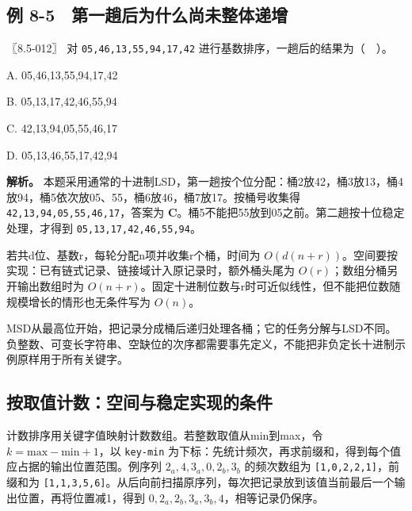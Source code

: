 
\subsection{例 8-5　第一趟后为什么尚未整体递增}\label{ds-ex8-5}

\noindent{}〖8.5-012〗 对 \texttt{05,}\allowbreak{}\texttt{46,}\allowbreak{}\texttt{13,}\allowbreak{}\texttt{55,}\allowbreak{}\texttt{94,}\allowbreak{}\texttt{17,}\allowbreak{}\texttt{42} 进行基数排序，一趟后的结果为（　）。

A. 05,46,13,55,94,17,42

B. 05,13,17,42,46,55,94

C. 42,13,94,05,55,46,17

D. 05,13,46,55,17,42,94


\textbf{解析。} 本题采用通常的十进制LSD，第一趟按个位分配：桶2放42，桶3放13，桶4放94，桶5依次放05、55，桶6放46，桶7放17。按桶号收集得 \texttt{42,}\allowbreak{}\texttt{13,}\allowbreak{}\texttt{94,}\allowbreak{}\texttt{05,}\allowbreak{}\texttt{55,}\allowbreak{}\texttt{46,}\allowbreak{}\texttt{17}，答案为 \textbf{C}。桶5不能把55放到05之前。第二趟按十位稳定处理，才得到 \texttt{05,}\allowbreak{}\texttt{13,}\allowbreak{}\texttt{17,}\allowbreak{}\texttt{42,}\allowbreak{}\texttt{46,}\allowbreak{}\texttt{55,}\allowbreak{}\texttt{94}。

若共d位、基数r，每轮分配n项并收集r个桶，时间为 \(O(d(n+r))\)。空间要按实现：已有链式记录、链接域计入原记录时，额外桶头尾为 \(O(r)\)；数组分桶另开输出数组时为 \(O(n+r)\)。固定十进制位数与r时可近似线性，但不能把位数随规模增长的情形也无条件写为 \(O(n)\)。

MSD从最高位开始，把记录分成桶后递归处理各桶；它的任务分解与LSD不同。负整数、可变长字符串、空缺位的次序都需要事先定义，不能把非负定长十进制示例原样用于所有关键字。

\subsection{按取值计数：空间与稳定实现的条件}\label{ds-c08-h175}

计数排序用关键字值映射计数数组。若整数取值从min到max，令 \(k=\mathrm{max}-\mathrm{min}+1\)，以 \texttt{key-min} 为下标：先统计频次，再求前缀和，得到每个值应占据的输出位置范围。例序列 \(2_a,4,3_a,0,2_b,3_b\) 的频次数组为 \texttt{{[}1,}\allowbreak{}\texttt{0,}\allowbreak{}\texttt{2,}\allowbreak{}\texttt{2,}\allowbreak{}\texttt{1{]}}，前缀和为 \texttt{{[}1,}\allowbreak{}\texttt{1,}\allowbreak{}\texttt{3,}\allowbreak{}\texttt{5,}\allowbreak{}\texttt{6{]}}。从后向前扫描原序列，每次把记录放到该值当前最后一个输出位置，再将位置减1，得到 \(0,2_a,2_b,3_a,3_b,4\)，相等记录仍保序。

